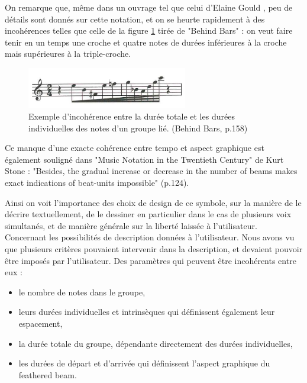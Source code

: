 \documentclass{article}
\begin{document}

On remarque que, même dans un ouvrage tel que celui d'Elaine Gould \cite{ref2}, peu de détails sont donnés sur cette notation, et on se heurte rapidement à des incohérences telles que celle de la figure \ref{fig:incoherence} tirée de "Behind Bars" : on veut faire tenir en un temps une croche et quatre notes de durées inférieures à la croche mais supérieures à la triple-croche. 

\begin{figure}[h]
\centering
\includegraphics[width=7cm]{img/behindbars.jpg}
\caption{Exemple d'incohérence entre la durée totale et les durées individuelles des notes d'un groupe lié. (Behind Bars, p.158) }
\label{fig:incoherence}
\end{figure}

Ce manque d'une exacte cohérence entre tempo et aspect graphique est également souligné dans "Music Notation in the Twentieth Century" de Kurt Stone \cite{ref3} : "Besides, the gradual increase or decrease in the number of beams makes exact indications of beat-units impossible" (p.124).

Ainsi on voit l'importance des choix de design de ce symbole, sur la manière de le décrire textuellement, de le dessiner en particulier dans le cas de plusieurs voix simultanés, et de manière générale sur la liberté laissée à l'utilisateur.
\\

Concernant les possibilités de description données à l'utilisateur. Nous avons vu que plusieurs critères pouvaient intervenir dans la description, et devaient pouvoir être imposés par l'utilisateur. Des paramètres qui peuvent être incohérents entre eux :
\begin{itemize}
\item le nombre de notes dans le groupe,
\item leurs durées individuelles et intrinsèques qui définissent également leur espacement,
\item la durée totale du groupe, dépendante directement des durées individuelles,
\item les durées de départ et d'arrivée qui définissent l'aspect graphique du feathered beam.
\end{itemize}
\end{document}

